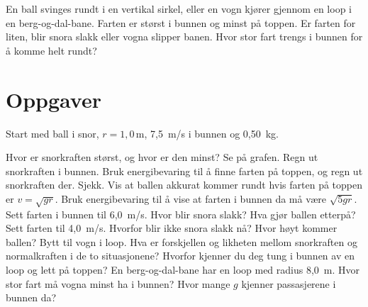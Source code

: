 \documentclass[11pt]{article}
\begin{document}

En ball svinges rundt i en vertikal sirkel, eller en vogn kjører gjennom en loop i en berg-og-dal-bane. Farten er størst i bunnen og minst på toppen. Er farten for liten, blir snora slakk eller vogna slipper banen. Hvor stor fart trengs i bunnen for å komme helt rundt?

\section*{Oppgaver}

Start med ball i snor, $r = 1{,}0\,\mathrm{m}$, 7,5~m/s i bunnen og 0,50~kg.

\begin{oppgaveliste}
\oppgave {}Hvor er snorkraften størst, og hvor er den minst? Se på grafen.
\svar
\oppgave {}Regn ut snorkraften i bunnen. Bruk energibevaring til å finne farten på toppen, og regn ut snorkraften der. Sjekk.
\svar
\oppgave {}Vis at ballen akkurat kommer rundt hvis farten på toppen er $v = \sqrt{gr}$. Bruk energibevaring til å vise at farten i bunnen da må være $\sqrt{5gr}$.
\svar
\oppgave {}Sett farten i bunnen til 6,0~m/s. Hvor blir snora slakk? Hva gjør ballen etterpå?
\svar
\oppgave {}Sett farten til 4,0~m/s. Hvorfor blir ikke snora slakk nå? Hvor høyt kommer ballen?
\svar
\oppgave {}Bytt til vogn i loop. Hva er forskjellen og likheten mellom snorkraften og normalkraften i de to situasjonene? Hvorfor kjenner du deg tung i bunnen av en loop og lett på toppen?
\svar
\oppgave {}En berg-og-dal-bane har en loop med radius 8,0~m. Hvor stor fart må vogna minst ha i bunnen? Hvor mange $g$ kjenner passasjerene i bunnen da?
\svar
\end{oppgaveliste}
\end{document}
